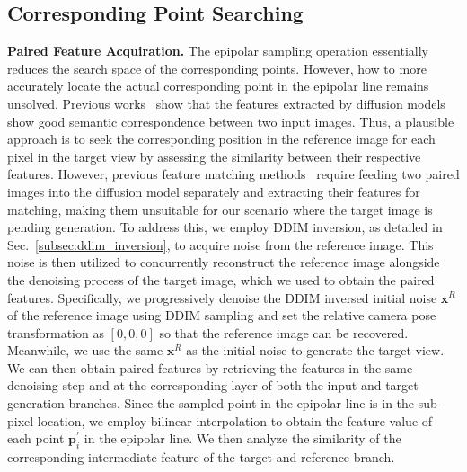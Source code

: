 \subsection{Corresponding Point Searching}\label{sec:fine_locate}
\noindent \textbf{Paired Feature Acquiration.}
The epipolar sampling operation essentially reduces the search space of the corresponding points. However, how to more accurately locate the actual corresponding point in the epipolar line remains unsolved. 
Previous works~\cite{dift, dino-sd} show that the features extracted by diffusion models show good semantic correspondence between two input images. 
Thus, a plausible approach is to seek the corresponding position in the reference image for each pixel in the target view by assessing the similarity between their respective features.
However, previous feature matching methods~\cite{dift, dino-sd} require feeding two paired images into the diffusion model separately and extracting their features for matching, making them unsuitable for our scenario where the target image is pending generation.
To address this, we employ DDIM inversion, as detailed in Sec.~\ref{subsec:ddim_inversion}, to acquire noise from the reference image.
This noise is then utilized to concurrently reconstruct the reference image alongside the denoising process of the target image, which we used to obtain the paired features.
Specifically, we progressively denoise the DDIM inversed initial noise $\boldsymbol{x}^R$ of the reference image using DDIM sampling and set the relative camera pose transformation as $[0, 0, 0]$ so that the reference image can be recovered. Meanwhile, we use the same $\boldsymbol{x}^R$ as the initial noise to generate the target view.
We can then obtain paired features by retrieving the features in the same denoising step and at the corresponding layer of both the input and target generation branches.
Since the sampled point in the epipolar line is in the sub-pixel location, we employ bilinear interpolation to obtain the feature value of each point $\boldsymbol{p}^{\prime}_i$ in the epipolar line.
We then analyze the similarity of the corresponding intermediate feature of the target and reference branch.


